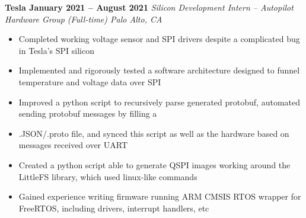 \documentclass[../main.tex]{subfiles}
\begin{document}
%
\noindent\textbf{{\fontsize{\textFontSize}{\textFontBox}\selectfont Tesla \hfill January 2021 – August 2021}}
\vspace{\jobHeaderDist}\newline
%
{\fontsize{\textFontSize}{\textFontBox}\selectfont\emph{Silicon Development Intern – Autopilot Hardware Group (Full-time) \hfill Palo Alto, CA \hspace{0 cm}}}\newline
\vspace{\listHeight}
%
%
\begin{itemize}
  \setlength{\itemindent}{-6mm}
  \vspace{\listItemDist}\item {\fontsize{\textFontSize}{\textFontBox}\selectfont Completed working voltage sensor and SPI drivers despite a complicated bug in Tesla’s SPI silicon}
  \vspace{\listItemDistTwo}\item {\fontsize{\textFontSize}{\textFontBox}\selectfont Implemented and rigorously tested a software architecture designed to funnel temperature and voltage data over SPI}
  \vspace{\listItemDistTwo}\item {\fontsize{\textFontSize}{\textFontBox}\selectfont Improved a python script to recursively parse generated protobuf, automated sending protobuf messages by filling a}
  \vspace{\listItemDistTwo}\item {\fontsize{\textFontSize}{\textFontBox}\selectfont .JSON/.proto file, and synced this script as well as the hardware based on messages received over UART}
  \vspace{\listItemDistTwo}\item {\fontsize{\textFontSize}{\textFontBox}\selectfont Created a python script able to generate QSPI images working around the LittleFS library, which used linux-like commands} %
  \vspace{\listItemDistTwo}\item {\fontsize{\textFontSize}{\textFontBox}\selectfont Gained experience writing firmware running ARM CMSIS RTOS wrapper for FreeRTOS, including drivers, interrupt handlers, etc}
\end{itemize}
%
%
\vspace{-0.1cm}
%
\end{document}
